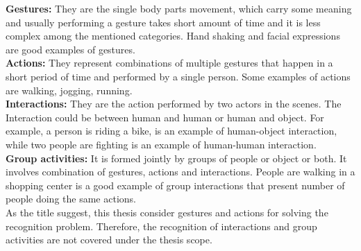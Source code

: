 \textbf{Gestures:} They are the single body parts movement, which carry some meaning and usually performing a gesture takes short amount of time and it is less complex among the mentioned categories. Hand shaking and facial expressions are good examples of gestures.\\

\textbf{Actions:} They represent combinations of multiple gestures that happen in a short period of time and performed by a single person. Some examples of actions are walking, jogging, running.\\

\textbf{Interactions:} They are the action performed by two actors in the scenes. The Interaction could be between human and human or human and object. For example, a person is riding a bike, is an example of human-object interaction, while two people are fighting is an example of human-human interaction.\\

\textbf{Group activities:} It is formed jointly by groups of people or object or both. It involves combination of gestures, actions and interactions. People are walking in a shopping center is a good example of group interactions that present number of people doing the same actions.\\

As the title suggest, this thesis consider gestures and actions for solving the recognition problem. Therefore, the recognition of interactions and group activities are not covered under the thesis scope.\\


